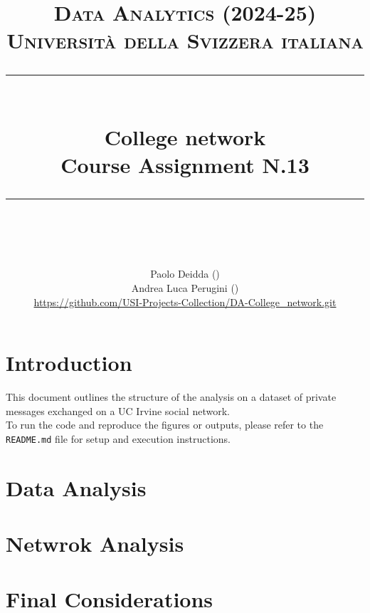 \documentclass{article}
\title{
	\normalfont\normalsize
	\textsc{Data Analytics (2024-25)\\
	Universit\`a della Svizzera italiana}\\
	\rule{\linewidth}{0.5pt}\\
	{\huge College network\\
	\small Course Assignment N.13}\\
	\rule{\linewidth}{1pt}\\
	\vspace{5pt}
}
\author{
	Paolo Deidda (\text{paolo.deidda@usi.ch}) \\ 
	Andrea Luca Perugini (\text{andrea.perugini@usi.ch})\\
	\url{https://github.com/USI-Projects-Collection/DA-College_network.git}
	}
\begin{document}
\maketitle

\tableofcontents

\newpage

\section*{Introduction}
This document outlines the structure of the analysis on a dataset of private messages exchanged on a UC Irvine social network.\\

To run the code and reproduce the figures or outputs, please refer to the \texttt{README.md} file for setup and execution instructions.

\section{Data Analysis}


\newpage

\section{Netwrok Analysis}




\section{Final Considerations}
\end{document}
